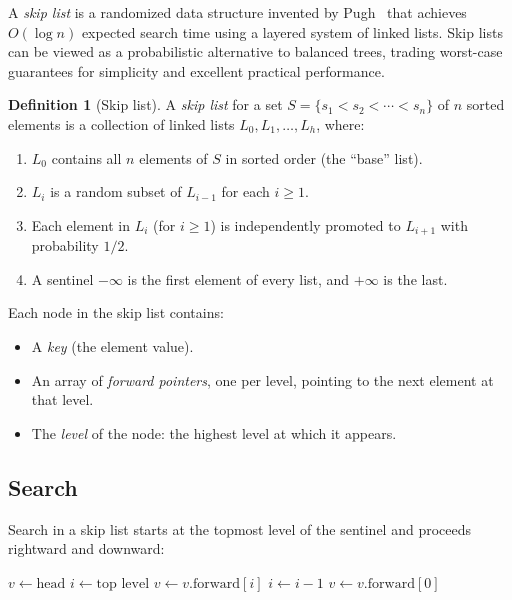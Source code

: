 \documentclass[twoside,12pt]{book}
\theoremstyle{plain}
\theoremstyle{definition}
\newtheorem{definition}[theorem]{Definition}
\theoremstyle{remark}
\begin{document}
A \emph{skip list} is a randomized data structure invented by Pugh~\cite{pugh1990} that achieves $O(\log n)$ expected search time using a layered system of linked lists. Skip lists can be viewed as a probabilistic alternative to balanced trees, trading worst-case guarantees for simplicity and excellent practical performance.

\begin{definition}[Skip list]
A \emph{skip list} for a set $S = \{s_1 < s_2 < \cdots < s_n\}$ of $n$ sorted elements is a collection of linked lists $L_0, L_1, \ldots, L_h$, where:
\begin{enumerate}[nosep]
    \item $L_0$ contains all $n$ elements of $S$ in sorted order (the ``base'' list).
    \item $L_i$ is a random subset of $L_{i-1}$ for each $i \geq 1$.
    \item Each element in $L_i$ (for $i \geq 1$) is independently promoted to $L_{i+1}$ with probability $1/2$.
    \item A sentinel $-\infty$ is the first element of every list, and $+\infty$ is the last.
\end{enumerate}
\end{definition}

Each node in the skip list contains:
\begin{itemize}[nosep]
    \item A \emph{key} (the element value).
    \item An array of \emph{forward pointers}, one per level, pointing to the next element at that level.
    \item The \emph{level} of the node: the highest level at which it appears.
\end{itemize}

\subsection{Search}

Search in a skip list starts at the topmost level of the sentinel and proceeds rightward and downward:

\begin{algorithm}[H]
\caption{Skip List Search}
\begin{algorithmic}[1]
    \State $v \gets \text{head}$
    \State $i \gets \text{top level}$
            \State $v \gets v.\text{forward}[i]$
        \EndWhile
        \State $i \gets i - 1$
    \EndWhile
    \State $v \gets v.\text{forward}[0]$
        \State {}
    \Else
        \State {}
    \EndIf
\EndFunction
\end{algorithmic}
\end{algorithm}
\end{document}
